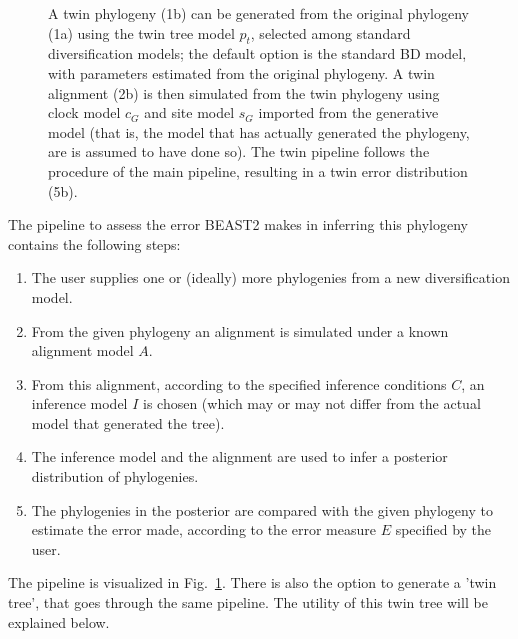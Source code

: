 \begin{figure}
{    A twin phylogeny (1b) can be generated from the original 
    phylogeny (1a) using the twin tree model $\mathit{p_{t}}$, 
    selected among standard diversification models; 
    the default option is the standard BD model, 
    with parameters estimated from the original phylogeny.
    A twin alignment (2b) is then simulated from the twin phylogeny 
    using clock model $\mathit{c_{G}}$ and site model $\mathit{s_{G}}$ 
    imported from the generative model (that is, the model that has
    actually generated the phylogeny, are is assumed to have done so). 
    The twin pipeline follows the procedure of the main pipeline, 
    resulting in a twin error distribution (5b).
  }
  \label{fig:pipeline}
\end{figure}

The pipeline to assess the error BEAST2 makes in inferring this phylogeny 
contains the following steps:
\begin{enumerate}
  \item The user supplies one or (ideally) more phylogenies from a 
    new diversification model.
  \item From the given phylogeny an alignment is simulated 
    under a known alignment model $\mathit{A}$.
  \item From this alignment, according to the specified 
    inference conditions $\mathit{C}$, 
    an inference model $\mathit{I}$ is chosen (which may or may not differ 
    from the actual model that generated the tree).
  \item The inference model and the alignment are used 
    to infer a posterior distribution of phylogenies.
  \item The phylogenies in the posterior are compared with the given phylogeny 
    to estimate the error made, according to 
    the error measure $\mathit{E}$ specified by the user.
\end{enumerate}

The pipeline is visualized in Fig.~\ref{fig:pipeline}. 
There is also the option to generate a 'twin tree', 
that goes through the same pipeline. 
The utility of this twin tree will be explained below.


